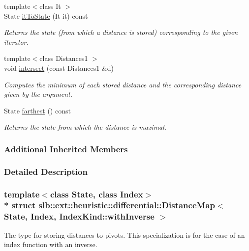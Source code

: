 \begin{DoxyCompactItemize}
{\footnotesize template$<$class It $>$ }\\State \hyperlink{structslb_1_1ext_1_1heuristic_1_1differential_1_1DistanceMap_3_01State_00_01Index_00_01IndexKind_1_1withInverse_01_4_a9e5c7a32a51e2e3dcab50c8215d2b8f8}{it\+To\+State} (It it) const 
\begin{DoxyCompactList}\small\item\em Returns the state (from which a distance is stored) corresponding to the given iterator. \end{DoxyCompactList}\item 
{\footnotesize template$<$class Distances1 $>$ }\\void \hyperlink{structslb_1_1ext_1_1heuristic_1_1differential_1_1DistanceMap_3_01State_00_01Index_00_01IndexKind_1_1withInverse_01_4_a098b550f0adfc698960fba13a9593cfe}{intersect} (const Distances1 \&d)
\begin{DoxyCompactList}\small\item\em Computes the minimum of each stored distance and the corresponding distance given by the argument. \end{DoxyCompactList}\item 
State \hyperlink{structslb_1_1ext_1_1heuristic_1_1differential_1_1DistanceMap_3_01State_00_01Index_00_01IndexKind_1_1withInverse_01_4_ae0612ad599cacab6742a174f783f4363}{farthest} () const 
\begin{DoxyCompactList}\small\item\em Returns the state from which the distance is maximal. \end{DoxyCompactList}\end{DoxyCompactItemize}
\subsubsection*{Additional Inherited Members}


\subsubsection{Detailed Description}
\subsubsection*{template$<$class State, class Index$>$\\*
struct slb\+::ext\+::heuristic\+::differential\+::\+Distance\+Map$<$ State, Index, Index\+Kind\+::with\+Inverse $>$}

The type for storing distances to pivots. This specialization is for the case of an index function with an inverse. 


